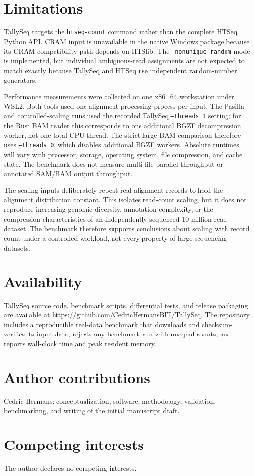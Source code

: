 \documentclass[11pt]{article}
\begin{document}
\section{Limitations}

TallySeq targets the \texttt{htseq-count} command rather than the complete HTSeq Python API. CRAM input is unavailable in the native Windows package because its CRAM compatibility path depends on HTSlib. The \texttt{--nonunique random} mode is implemented, but individual ambiguous-read assignments are not expected to match exactly because TallySeq and HTSeq use independent random-number generators.

Performance measurements were collected on one x86\_64 workstation under WSL2. Both tools used one alignment-processing process per input. The Pasilla and controlled-scaling runs used the recorded TallySeq \texttt{--threads 1} setting; for the Rust BAM reader this corresponds to one additional BGZF decompression worker, not one total CPU thread. The strict large-BAM comparison therefore uses \texttt{--threads 0}, which disables additional BGZF workers. Absolute runtimes will vary with processor, storage, operating system, file compression, and cache state. The benchmark does not measure multi-file parallel throughput or annotated SAM/BAM output throughput.

The scaling inputs deliberately repeat real alignment records to hold the alignment distribution constant. This isolates read-count scaling, but it does not reproduce increasing genomic diversity, annotation complexity, or the compression characteristics of an independently sequenced 10-million-read dataset. The benchmark therefore supports conclusions about scaling with record count under a controlled workload, not every property of large sequencing datasets.

\section{Availability}

TallySeq source code, benchmark scripts, differential tests, and release packaging are available at \url{https://github.com/CedricHermansBIT/TallySeq}. The repository includes a reproducible real-data benchmark that downloads and checksum-verifies its input data, rejects any benchmark run with unequal counts, and reports wall-clock time and peak resident memory.

\section{Author contributions}

Cedric Hermans: conceptualization, software, methodology, validation, benchmarking, and writing of the initial manuscript draft.

\section{Competing interests}

The author declares no competing interests.



\end{document}
